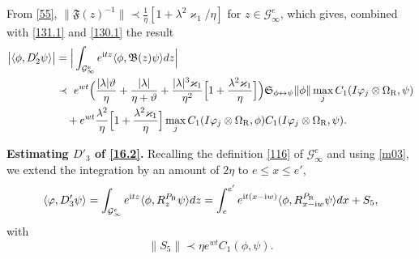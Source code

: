 \documentclass[letterpaper,onecolumn,11pt,accepted=2021-12-09]{quantumarticle}
\numberwithin{equation}{section}
\newcommand{\sym}{ {\mathfrak S}_{\phi\leftrightarrow\psi}}
\renewcommand{\r}{{\rm R}}
\renewcommand{\i}{{\rm i}}
\begin{document}
From \eqref{55}, $\|{\mathfrak F}(z)^{-1}\|\prec \frac{1}{\eta}[1+\lambda^2\varkappa_1/\eta]$ for $z\in{\mathcal G}_\infty^e$, which gives, combined with \eqref{131.1} and  \eqref{130.1} the result
\begin{align}
\big| \langle \phi, D'_2\psi\rangle \big| & = \Big| \int_{{\mathcal G}_\infty^e} e^{\i tz}\langle \phi, {\mathfrak B}(z)\psi\rangle dz \Big|\\
  & \prec  
	\ e^{wt} \Big( \frac{|\lambda|\vartheta}{\eta} + \frac{|\lambda|}{\eta+\vartheta} +\frac{|\lambda|^3\varkappa_1}{\eta^2} \Big[ 1+\frac{\lambda^2\varkappa_1}{\eta}\Big]\Big)  \sym  \|\phi\|  \max_j C_1(I\varphi_j\otimes\Omega_\r,\psi)  \nonumber \\
& \quad +e^{wt}\frac{\lambda^2}{\eta} \Big[1+\frac{\lambda^2\varkappa_1}{\eta}\Big]\max_j  C_1(I\varphi_j\otimes\Omega_\r, \phi)  C_1(I\varphi_j\otimes \Omega_\r,\psi).
	\label{132.1}
\end{align}
\medskip

\noindent
{\bf Estimating $D'_3$ of \eqref{16.2}. } Recalling the definition \eqref{116} of ${\mathcal G}_\infty^e$ and using \eqref{m03}, we extend the integration by an amount of $2\eta$ to $e\le x\le e'$, 
\begin{equation}
\langle \varphi, D'_3 \psi\rangle = \int_{{\mathcal G}_\infty^e} e^{\i t z} \langle \phi, R_z^{P_\r} \psi\rangle dz = \int_e^{e'} e^{\i t (x-\i w)} \langle \phi, R_{x-\i w}^{P_\r}\psi\rangle dx  +S_5,
\label{126.2}
\end{equation}
with 
\begin{equation}
\label{127.2}
\|S_5\| \prec  \eta e^{wt} C_1(\phi, \psi).
\end{equation}




\bigskip
\end{document}
